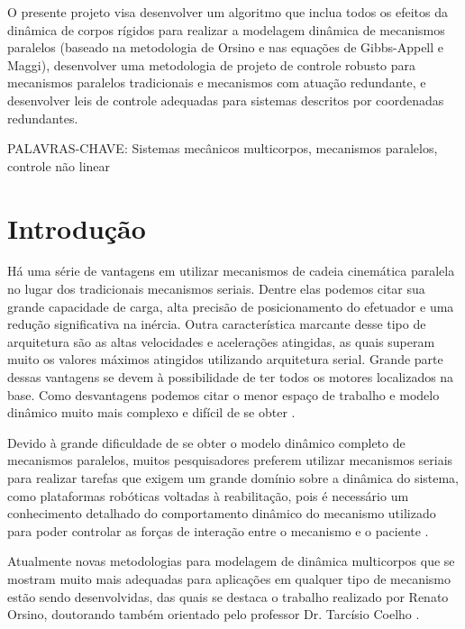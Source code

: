 \documentclass[a4paper,11pt,brazil,fleqn]{article}
\begin{document}
O presente projeto visa desenvolver um algoritmo que inclua todos os efeitos da din\^amica de corpos r\'igidos para realizar a modelagem din\^amica de mecanismos paralelos (baseado na metodologia de Orsino e nas equa\c{c}\~oes de Gibbs-Appell e Maggi), desenvolver uma metodologia de projeto de controle robusto para mecanismos paralelos tradicionais e mecanismos com atua\c{c}\~ao redundante, e desenvolver leis de controle adequadas para sistemas descritos por coordenadas redundantes.

\vspace{10pt}

\noindent
PALAVRAS-CHAVE: {Sistemas mec\^anicos multicorpos, mecanismos paralelos, controle n\~ao linear}






\newpage
\section{Introdu\c{c}\~ao}\label{S01}

H\'a uma s\'erie de vantagens em utilizar mecanismos de cadeia cinem\'atica paralela no lugar dos tradicionais mecanismos seriais. Dentre elas podemos citar sua grande capacidade de carga, alta precis\~ao de posicionamento do efetuador e uma redu\c{c}\~ao significativa na in\'ercia. Outra caracter\'istica marcante desse tipo de arquitetura s\~ao as altas velocidades e acelera\c{c}\~oes atingidas, as quais superam muito os valores m\'aximos atingidos utilizando arquitetura serial. Grande parte dessas vantagens se devem \`a possibilidade de ter todos os motores localizados na base. Como desvantagens podemos citar o menor espa\c{c}o de trabalho e modelo din\^amico muito mais complexo e dif\'icil de se obter \cite{Merlet2002, Rynaldo}. 

	Devido \`a grande dificuldade de se obter o modelo din\^amico completo de mecanismos paralelos, muitos pesquisadores preferem utilizar mecanismos seriais para realizar tarefas que exigem um grande dom\'inio sobre a din\^amica do sistema, como plataformas rob\'oticas voltadas \`a reabilita\c{c}\~ao, pois \'e necess\'ario um conhecimento detalhado do comportamento din\^amico do mecanismo utilizado para poder controlar as for\c{c}as de intera\c{c}\~ao entre o mecanismo e o paciente \cite{Andre, Andre2}.
	
	Atualmente novas metodologias para modelagem de din\^amica multicorpos que se mostram muito mais adequadas para aplica\c{c}\~oes em qualquer tipo de mecanismo est\~ao sendo desenvolvidas, das quais se destaca o trabalho realizado por Renato Orsino, doutorando tamb\'em orientado pelo professor Dr. Tarc\'isio Coelho \cite{Orsino2013, Apostila}.
	
\end{document}
